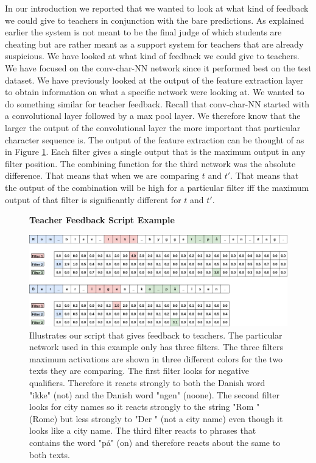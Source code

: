 In our introduction we reported that we wanted to look at what kind of feedback
we could give to teachers in conjunction with the bare predictions. As explained
earlier the system is not meant to be the final judge of which students are
cheating but are rather meant as a support system for teachers that are
already suspicious. We have looked at what kind of feedback we could give to
teachers. We have focused on the \gls{conv-char-NN} network since it performed
best on the test dataset. We have previously looked at the output of the
feature extraction layer to obtain information on what a specific network
were looking at. We wanted to do something similar for teacher feedback.
Recall that \gls{conv-char-NN} started with a convolutional layer followed
by a max pool layer. We therefore know that the larger the output of the
convolutional layer the more important that particular character sequence
is. The output of the feature extraction can be thought of as in Figure
\ref{fig:feature_extraction_output_example}. Each filter gives a single
output that is the maximum output in any filter position. The combining function
for the third network was the absolute difference. That means that when we
are comparing $t$ and $t'$. That means that the output of the combination
will be high for a particular filter iff the maximum output of that filter is
significantly different for $t$ and $t'$.

\begin{figure}
    \centering
    \textbf{Teacher Feedback Script Example}\par\medskip
    \includegraphics[width=\textwidth]{./pictures/discussion/teacher_feedback_example.png}
    \caption{Illustrates our script that gives feedback to teachers. The
        particular network used in this example only has three filters. The
        three filters maximum activations are shown in three different colors
        for the two texts they are comparing. The first filter looks for
        negative qualifiers. Therefore it reacts strongly to both the Danish
        word "ikke" (not) and the Danish word "ngen" (noone). The second filter
        looks for city names so it reacts strongly to the string "Rom " (Rome)
        but less strongly to "Der " (not a city name) even though it looks like
        a city name. The third filter reacts to phrases that contains the word
        "p\aa " (on) and therefore reacts about the same to both texts.}
    \label{fig:feature_extraction_output_example}
\end{figure}

